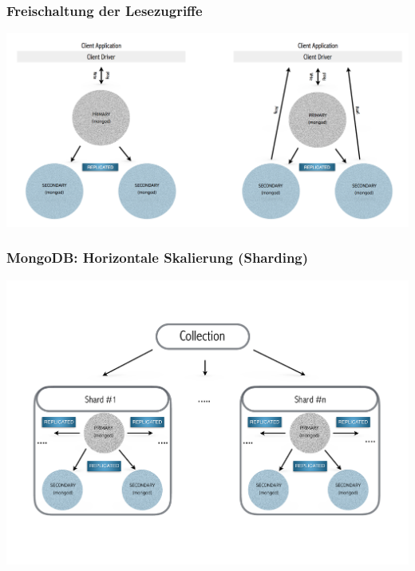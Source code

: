 \documentclass{beamer} %
\begin{document}
\begin{frame}
\frametitle{Freischaltung der Lesezugriffe}
\includegraphics[width=1.0\textwidth]{img/slaveOK}
\end{frame}

\begin{frame}
\frametitle{MongoDB: Horizontale Skalierung (Sharding)}
\includegraphics[trim = 0mm 35mm 0mm 30mm, clip, width=1.0\textwidth]{img/sharding}
\end{frame}
\end{document}
